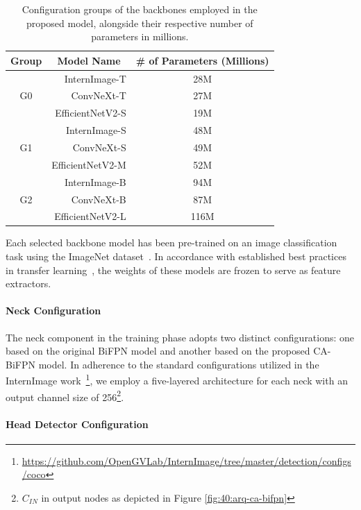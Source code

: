 \begin{table}[!htbp]
\centering 
\begin{tabular}{c|r|c}
Group & \multicolumn{1}{c|}{Model Name} & \multicolumn{1}{c}{\textbf{\# of Parameters (Millions)}} \\ \hline
\multirow{3}{*}{G0} & InternImage-T & 28M \\
                    & ConvNeXt-T & 27M \\
                    & EfficientNetV2-S & 19M \\ \hline
\multirow{3}{*}{G1} & InternImage-S & 48M \\
                    & ConvNeXt-S & 49M \\
                    & EfficientNetV2-M & 52M \\ \hline
\multirow{3}{*}{G2} & InternImage-B & 94M \\
                    & ConvNeXt-B & 87M \\
                    & EfficientNetV2-L & 116M \\
\end{tabular}
\caption{Configuration groups of the backbones employed in the proposed model, alongside their respective number of parameters in millions.}
\label{tab:50:back-configs}
\end{table}

Each selected backbone model has been pre-trained on an image classification task using the ImageNet dataset~\cite{5206848}. In accordance with established best practices in transfer learning~\cite{DBLP:journals/corr/YosinskiCBL14}, the weights of these models are frozen to serve as feature extractors.

\paragraph{Neck Configuration}

The neck component in the training phase adopts two distinct configurations: one based on the original BiFPN model and another based on the proposed CA-BiFPN model. In adherence to the standard configurations utilized in the InternImage work~\footnote{\url{https://github.com/OpenGVLab/InternImage/tree/master/detection/configs/coco}}, we employ a five-layered architecture for each neck with an output channel size of 256\footnote{\(C_{IN}\) in output nodes as depicted in Figure \ref{fig:40:arq-ca-bifpn}}.

\paragraph{Head Detector Configuration}

